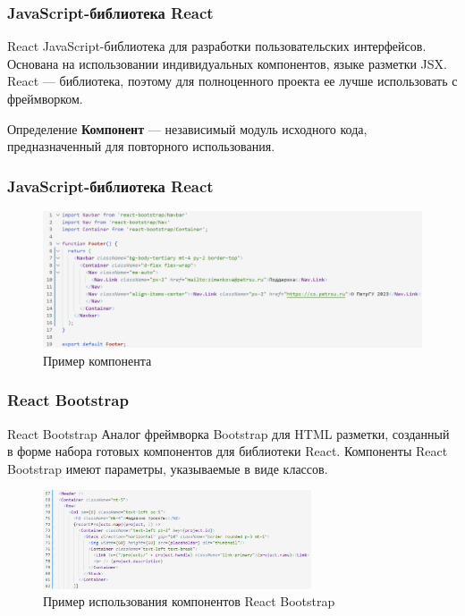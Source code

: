 \documentclass[hyperref={unicode}]{beamer}
\begin{document}
\begin{frame}
	\frametitle{JavaScript-библиотека React}
	\begin{block}{React}
		JavaScript-библиотека для разработки пользовательских интерфейсов. Основана на использовании индивидуальных компонентов, языке разметки JSX. React — библиотека, поэтому для полноценного проекта ее лучше использовать с фреймворком.
	\end{block}
	
	\begin{block}{Определение}
		\textbf{Компонент} — независимый модуль исходного кода, предназначенный для повторного использования.
	\end{block}
\end{frame}

\begin{frame}
	\frametitle{JavaScript-библиотека React}
	\begin{figure}
	\includegraphics[width=\textwidth]{images/component.png}
	\caption{Пример компонента}
	\end{figure}
\end{frame}

\begin{frame}
	\frametitle{React Bootstrap}
	\begin{block}{React Bootstrap}
	Аналог фреймворка Bootstrap для HTML разметки, созданный в форме набора готовых компонентов для библиотеки React. Компоненты React Bootstrap имеют параметры, указываемые в виде классов.
	\end{block}

	\begin{figure}
	\includegraphics[width=300px]{images/bootstrapcomponents.png}
	\caption{Пример использования компонентов React Bootstrap}
	\end{figure}
\end{frame}
\end{document}
